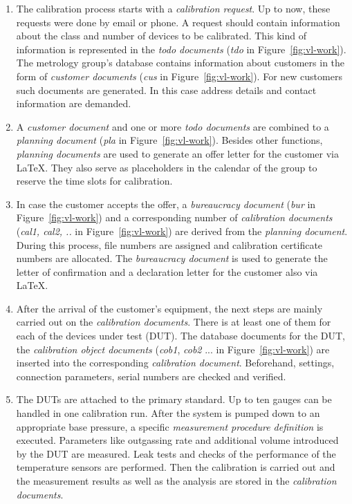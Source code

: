 \documentclass[3p,times,procedia]{elsarticle}
\begin{document}
\begin{enumerate}
  
\item The calibration process starts with a \emph{calibration
  request}. Up to now, these requests were done by email or phone. A request
  should contain information about the class and number of devices to be
  calibrated. This kind of information is represented in the \emph{todo
    documents} %
  (\emph{tdo} in Figure~\ref{fig:vl-work}).  The metrology group's database contains
  information about customers in the form of \emph{customer documents}
  (\emph{cus} in Figure~\ref{fig:vl-work}). For new customers such
  documents are generated. In this case address details and contact
  information are demanded. 
  
\item A \emph{customer document} and one or more
  \emph{todo documents} are combined to a \emph{planning document}
  (\emph{pla} in Figure~\ref{fig:vl-work}). Besides other functions,
  \emph{planning documents} are used to generate an offer letter for
  the customer via \LaTeX. They also serve as placeholders in the 
  calendar of the group to reserve the time slots for calibration.  %
  
\item In case the customer accepts the offer, a \emph{bureaucracy
  document} (\emph{bur} in Figure~\ref{fig:vl-work}) and a
  corresponding number of \emph{calibration documents} (\emph{cal1,
    cal2, ..} in Figure~\ref{fig:vl-work}) are derived from the
  \emph{planning document}. During this process, file numbers are
  assigned and calibration certificate numbers are allocated. The
  \emph{bureaucracy document} is used to generate the letter of
  confirmation and a declaration letter for the customer also via
  \LaTeX.

\item After the arrival of the customer's equipment, the next steps are mainly
  carried out on the \emph{calibration documents}. There is at least one of
  them for each of the devices under test (DUT). The database documents
  for the DUT, the \emph{calibration object documents} (\emph{cob1},
  \emph{cob2} ...  in Figure~\ref{fig:vl-work}) are inserted into
  the corresponding \emph{calibration document}. Beforehand, settings,
  connection parameters, serial numbers are checked and verified.

\item The DUTs are attached to the primary standard. Up to ten gauges
  can be handled in one calibration run. After the system is pumped
  down to an appropriate base pressure, a specific \emph{measurement
    procedure definition} is executed. Parameters like outgassing
  rate and additional volume introduced by the DUT are measured. Leak
  tests and checks of the performance of the temperature sensors are performed.
  Then the calibration is carried out and the measurement results as well as
  the analysis are stored in the \emph{calibration documents}.


\end{enumerate}
\end{document}
